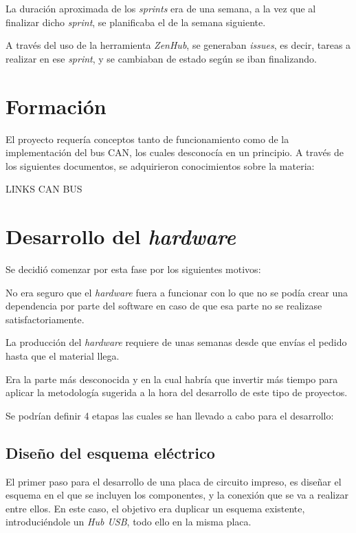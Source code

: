La duración aproximada de los \emph{sprints} era de una semana, a la vez que al finalizar dicho \emph{sprint}, se planificaba el de la semana siguiente.

A través del uso de la herramienta \emph{ZenHub}, se generaban \emph{issues}, es decir, tareas a realizar en ese \emph{sprint}, y se cambiaban de estado según se iban finalizando.

\section{Formación}\label{formacion}

El proyecto requería conceptos tanto de funcionamiento como de la implementación del bus CAN, los cuales desconocía en un principio. A través de los siguientes documentos, se adquirieron conocimientos sobre la materia:


LINKS CAN BUS


\section{Desarrollo del \emph{hardware}}\label{desarrollo_del_hardware}

Se decidió comenzar por esta fase por los siguientes motivos:


No era seguro que el \emph{hardware} fuera a funcionar con lo que no se podía crear una dependencia por parte del software en caso de que esa parte no se realizase satisfactoriamente.

La producción del \emph{hardware} requiere de unas semanas desde que envías el pedido hasta que el material llega.

Era la parte más desconocida y en la cual habría que invertir más tiempo para aplicar la metodología sugerida a la hora del desarrollo de este tipo de proyectos.

Se podrían definir 4 etapas las cuales se han llevado a cabo para el desarrollo:

\subsection{Diseño del esquema eléctrico}\label{diseño_del_esquema_electrico}

El primer paso para el desarrollo de una placa de circuito impreso, es diseñar el esquema en el que se incluyen los componentes, y la conexión que se va a realizar entre ellos. En este caso, el objetivo era duplicar un esquema existente, introduciéndole un \emph{Hub USB}, todo ello en la misma placa.

